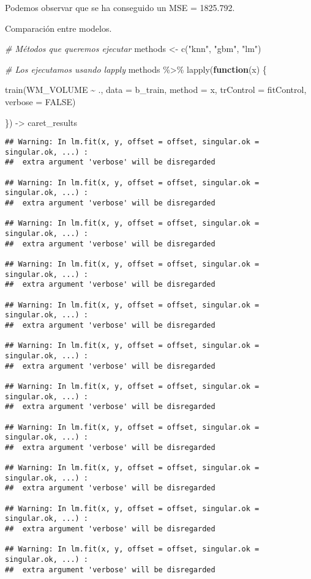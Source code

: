 \documentclass[
]{article}
\newenvironment{Shaded}{\begin{snugshade}}{\end{snugshade}}
\newcommand{\AttributeTok}[1]{\textcolor[rgb]{0.77,0.63,0.00}{#1}}
\newcommand{\CommentTok}[1]{\textcolor[rgb]{0.56,0.35,0.01}{\textit{#1}}}
\newcommand{\ConstantTok}[1]{\textcolor[rgb]{0.00,0.00,0.00}{#1}}
\newcommand{\ControlFlowTok}[1]{\textcolor[rgb]{0.13,0.29,0.53}{\textbf{#1}}}
\newcommand{\FunctionTok}[1]{\textcolor[rgb]{0.00,0.00,0.00}{#1}}
\newcommand{\NormalTok}[1]{#1}
\newcommand{\OtherTok}[1]{\textcolor[rgb]{0.56,0.35,0.01}{#1}}
\newcommand{\SpecialCharTok}[1]{\textcolor[rgb]{0.00,0.00,0.00}{#1}}
\newcommand{\StringTok}[1]{\textcolor[rgb]{0.31,0.60,0.02}{#1}}
\begin{document}
Podemos observar que se ha conseguido un MSE = 1825.792.

Comparación entre modelos.

\begin{Shaded}
\begin{Highlighting}[]
\CommentTok{\# Métodos que queremos ejecutar}
\NormalTok{methods }\OtherTok{\textless{}{-}} \FunctionTok{c}\NormalTok{(}\StringTok{"knn"}\NormalTok{, }\StringTok{"gbm"}\NormalTok{, }\StringTok{"lm"}\NormalTok{)}

\CommentTok{\# Los ejecutamos usando lapply}
\NormalTok{methods }\SpecialCharTok{\%\textgreater{}\%} 
  \FunctionTok{lapply}\NormalTok{(}\ControlFlowTok{function}\NormalTok{(x) \{}
    
    \FunctionTok{train}\NormalTok{(WM\_VOLUME }\SpecialCharTok{\textasciitilde{}}\NormalTok{ ., }
          \AttributeTok{data =}\NormalTok{ b\_train,}
          \AttributeTok{method =}\NormalTok{ x,}
          \AttributeTok{trControl =}\NormalTok{ fitControl,}
          \AttributeTok{verbose =} \ConstantTok{FALSE}\NormalTok{)}
    
\NormalTok{  \}) }\OtherTok{{-}\textgreater{}}\NormalTok{ caret\_results}
\end{Highlighting}
\end{Shaded}

\begin{verbatim}
## Warning: In lm.fit(x, y, offset = offset, singular.ok = singular.ok, ...) :
##  extra argument 'verbose' will be disregarded

## Warning: In lm.fit(x, y, offset = offset, singular.ok = singular.ok, ...) :
##  extra argument 'verbose' will be disregarded

## Warning: In lm.fit(x, y, offset = offset, singular.ok = singular.ok, ...) :
##  extra argument 'verbose' will be disregarded

## Warning: In lm.fit(x, y, offset = offset, singular.ok = singular.ok, ...) :
##  extra argument 'verbose' will be disregarded

## Warning: In lm.fit(x, y, offset = offset, singular.ok = singular.ok, ...) :
##  extra argument 'verbose' will be disregarded

## Warning: In lm.fit(x, y, offset = offset, singular.ok = singular.ok, ...) :
##  extra argument 'verbose' will be disregarded

## Warning: In lm.fit(x, y, offset = offset, singular.ok = singular.ok, ...) :
##  extra argument 'verbose' will be disregarded

## Warning: In lm.fit(x, y, offset = offset, singular.ok = singular.ok, ...) :
##  extra argument 'verbose' will be disregarded

## Warning: In lm.fit(x, y, offset = offset, singular.ok = singular.ok, ...) :
##  extra argument 'verbose' will be disregarded

## Warning: In lm.fit(x, y, offset = offset, singular.ok = singular.ok, ...) :
##  extra argument 'verbose' will be disregarded

## Warning: In lm.fit(x, y, offset = offset, singular.ok = singular.ok, ...) :
##  extra argument 'verbose' will be disregarded
\end{verbatim}
\end{document}
